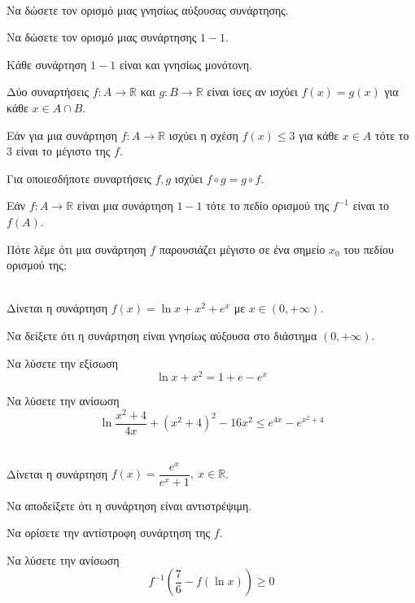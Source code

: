 \documentclass[twoside,nofonts,internet,math,spyros]{frontisthrio-diag}
\begin{document}
\begin{thema}
\item \mbox{}\\\vspace{-5mm}
\begin{erwthma}
\item Να δώσετε τον ορισμό μιας γνησίως αύξουσας συνάρτησης.
\item Να δώσετε τον ορισμό μιας συνάρτησης $ 1-1 $.
\item \swstolathospan
\begin{alist}
\item Κάθε συνάρτηση $ 1-1 $ είναι και γνησίως μονότονη.
\item Δύο συναρτήσεις $ f:A\to\mathbb{R} $ και $ g:B\to\mathbb{R} $ είναι ίσες αν ισχύει $ f(x)=g(x) $ για κάθε $ x\in A\cap B $.
\item Εάν για μια συνάρτηση $ f:A\to\mathbb{R} $ ισχύει η σχέση $ f(x)\leq 3 $ για κάθε $ x\in A $ τότε το $ 3 $ είναι το μέγιστο της $ f $.
\item Για οποιεσδήποτε συναρτήσεις $ f,g $ ισχύει $ f\circ g=g\circ f $.
\item Εάν $ f:A\to\mathbb{R} $ είναι μια συνάρτηση $ 1-1 $ τότε το πεδίο ορισμού της $ f^{-1} $ είναι το $ f(A) $.
\end{alist}
\item Πότε λέμε ότι μια συνάρτηση $ f $ παρουσιάζει μέγιστο σε ένα σημείο $ x_0 $ του πεδίου ορισμού της;\\
\end{erwthma}
\item \mbox{}\\
Δίνεται η συνάρτηση $ f(x)=\ln{x}+x^2+e^x $ με $ x\in(0,+\infty) $.
\begin{erwthma}
\item Να δείξετε ότι η συνάρτηση είναι γνησίως αύξουσα στο διάστημα $ (0,+\infty) $.
\item Να λύσετε την εξίσωση \[ \ln{x}+x^2=1+e-e^x \]
\item Να λύσετε την ανίσωση  \[ \ln{\dfrac{x^2+4}{4x}}+\left( x^2+4\right)^2-16x^2\leq e^{4x}-e^{x^2+4} \] 
\end{erwthma}
\item \mbox{}\\
Δίνεται η συνάρτηση $ f(x)=\dfrac{e^x}{e^x+1},\ x\in\mathbb{R} $.
\begin{erwthma}
\item Να αποδείξετε ότι η συνάρτηση είναι αντιστρέψιμη.
\item Να ορίσετε την αντίστροφη συνάρτηση της $ f $.
\item Να λύσετε την ανίσωση
\[ f^{-1}\left(\frac{7}{6}-f(\ln{x}) \right)\geq0  \]
\end{erwthma}
\end{thema}
\kaliepityxia
\end{document}
